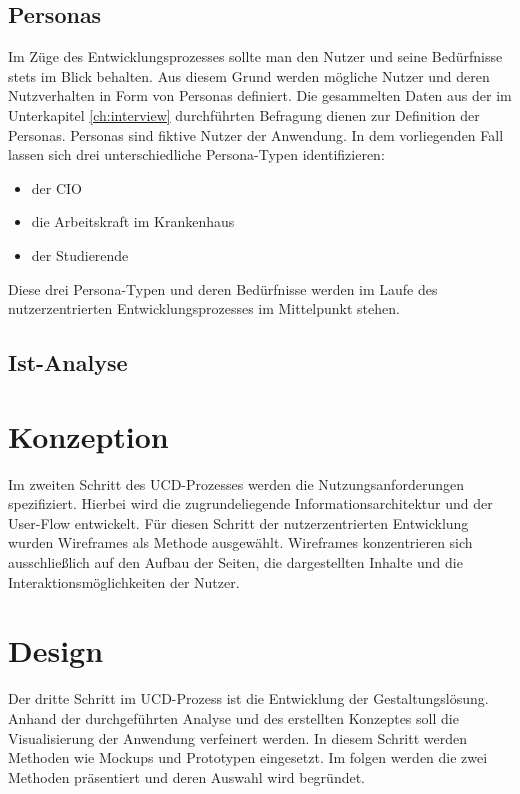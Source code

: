 \subsection{Personas}

Im Züge des Entwicklungsprozesses sollte man den Nutzer und seine Bedürfnisse stets im Blick behalten.
Aus diesem Grund werden mögliche Nutzer und deren Nutzverhalten in Form von Personas definiert.
Die gesammelten Daten aus der im Unterkapitel \ref{ch:interview} durchführten Befragung dienen zur Definition der Personas.
Personas sind fiktive Nutzer der Anwendung.
In dem vorliegenden Fall lassen sich drei unterschiedliche Persona-Typen identifizieren:

\begin{itemize}
	\item der \ac{CIO}
	\item die Arbeitskraft im Krankenhaus
	\item der Studierende
\end{itemize}

Diese drei Persona-Typen und deren Bedürfnisse werden im Laufe des nutzerzentrierten Entwicklungsprozesses im Mittelpunkt stehen.

\subsection{Ist-Analyse}



\section{Konzeption}\label{sec:concept}

Im zweiten Schritt des \ac{UCD}-Prozesses werden die Nutzungsanforderungen spezifiziert.
Hierbei wird die zugrundeliegende Informationsarchitektur und der User-Flow entwickelt.
Für diesen Schritt der nutzerzentrierten Entwicklung wurden Wireframes als Methode ausgewählt.
Wireframes konzentrieren sich ausschließlich auf den Aufbau der Seiten, die dargestellten Inhalte und die Interaktionsmöglichkeiten der Nutzer.

\section{Design}

Der dritte Schritt im \ac{UCD}-Prozess ist die Entwicklung der Gestaltungslösung.
Anhand der durchgeführten Analyse und des erstellten Konzeptes soll die Visualisierung der Anwendung verfeinert werden.
In diesem Schritt werden Methoden wie Mockups und Prototypen eingesetzt.
Im folgen werden die zwei Methoden präsentiert und deren Auswahl wird begründet.

